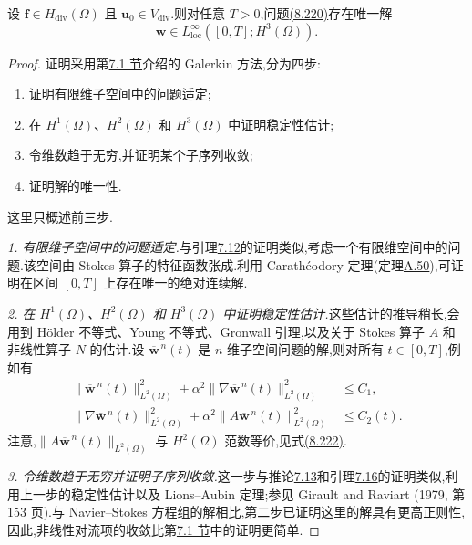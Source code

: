 \begin{theorem}[周期边界情形下解的存在唯一性]
\label{thm:navier-stokes-alpha-periodic-existence-uniqueness}
设 $\bm{f}\in H_{\mathrm{div}}(\Omega)$ 且 $\bm{u}_0\in V_{\mathrm{div}}$.则对任意 $T>0$,问题\hyperref[eq:navier-stokes-alpha-operator-form]{(8.220)}存在唯一解
\[
 \bm{w}\in L^\infty_{\mathrm{loc}}([0,T];H^3(\Omega)).
\]
\begin{proof}
证明采用第\hyperref[sec:time-dependent-ns-continuous]{7.1 节}介绍的 Galerkin 方法,分为四步:
\begin{enumerate}
 \item 证明有限维子空间中的问题适定;
 \item 在 $H^1(\Omega)$、$H^2(\Omega)$ 和 $H^3(\Omega)$ 中证明稳定性估计;
 \item 令维数趋于无穷,并证明某个子序列收敛;
 \item 证明解的唯一性.
\end{enumerate}
这里只概述前三步.

\emph{1. 有限维子空间中的问题适定.}与引理\hyperref[lem:time-dependent-galerkin-unique]{7.12}的证明类似,考虑一个有限维空间中的问题.该空间由 Stokes 算子的特征函数张成.利用 Carathéodory 定理(定理\hyperref[thm:appendix-a-50]{A.50}),可证明在区间 $[0,T]$ 上存在唯一的绝对连续解.

\emph{2. 在 $H^1(\Omega)$、$H^2(\Omega)$ 和 $H^3(\Omega)$ 中证明稳定性估计.}这些估计的推导稍长,会用到 Hölder 不等式、Young 不等式、Gronwall 引理,以及关于 Stokes 算子 $A$ 和非线性算子 $N$ 的估计.设 $\overline{\bm{w}}^{\,n}(t)$ 是 $n$ 维子空间问题的解,则对所有 $t\in[0,T]$,例如有
\[
\begin{aligned}
 \|\overline{\bm{w}}^{\,n}(t)\|_{L^2(\Omega)}^2
  +\alpha^2\|\nabla\overline{\bm{w}}^{\,n}(t)\|_{L^2(\Omega)}^2
  &\le C_1,\\
 \|\nabla\overline{\bm{w}}^{\,n}(t)\|_{L^2(\Omega)}^2
  +\alpha^2\|A\overline{\bm{w}}^{\,n}(t)\|_{L^2(\Omega)}^2
  &\le C_2(t).
\end{aligned}
\]
注意,$\|A\overline{\bm{w}}^{\,n}(t)\|_{L^2(\Omega)}$ 与 $H^2(\Omega)$ 范数等价,见式\hyperref[eq:navier-stokes-alpha-stokes-norm-equivalence]{(8.222)}.

\emph{3. 令维数趋于无穷并证明子序列收敛.}这一步与推论\hyperref[cor:time-dependent-galerkin-weak-convergence]{7.13}和引理\hyperref[lem:time-dependent-convection-convergence]{7.16}的证明类似,利用上一步的稳定性估计以及 Lions--Aubin 定理;参见 Girault and Raviart (1979, 第 153 页).与 Navier--Stokes 方程组的解相比,第二步已证明这里的解具有更高正则性,因此,非线性对流项的收敛比第\hyperref[sec:time-dependent-ns-continuous]{7.1 节}中的证明更简单.


\end{proof}
\end{theorem}
